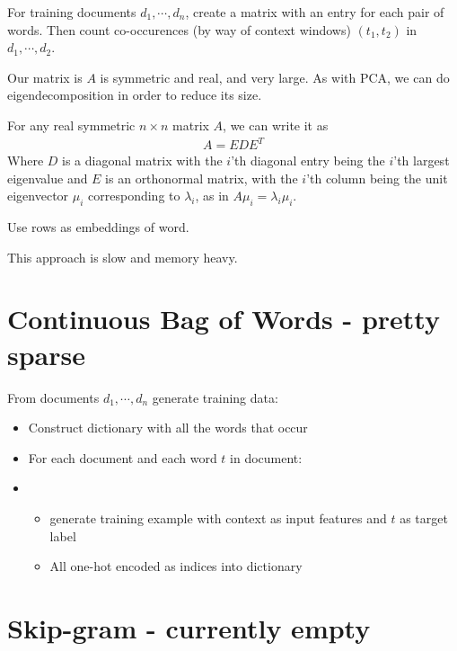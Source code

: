 \documentclass{article}
\begin{document}
  For training documents $d_1, \cdots, d_n$, create a matrix with an entry for each pair of words. Then count co-occurences (by way of context windows) $(t_1, t_2)$ in $d_1, \cdots, d_2$. 

  Our matrix is $A$ is symmetric and real, and very large. As with PCA, we can do eigendecomposition in order to reduce its size. 

  For any real symmetric $n \times n$ matrix $A$, we can write it as 
  \begin{align}
    A = EDE^T
  \end{align}
  Where $D$ is a diagonal matrix with the $i$'th diagonal entry being the $i$'th largest eigenvalue and $E$ is an orthonormal matrix, with the $i$'th column being the unit eigenvector $\mu_i$ corresponding to $\lambda_i$, as in $A \mu_i = \lambda_i \mu_i$. 

  Use rows as embeddings of word.

  This approach is slow and memory heavy.

\section{Continuous Bag of Words - pretty sparse}
  From documents $d_1, \cdots, d_n$ generate training data:
  \begin{itemize}
    \item Construct dictionary with all the words that occur
    \item For each document and each word $t$ in document:
    \item \begin{itemize}
      \item generate training example with context as input features and $t$ as target label
      \item All one-hot encoded as indices into dictionary
    \end{itemize}
    
  \end{itemize}



\section{Skip-gram - currently empty}
\end{document}
